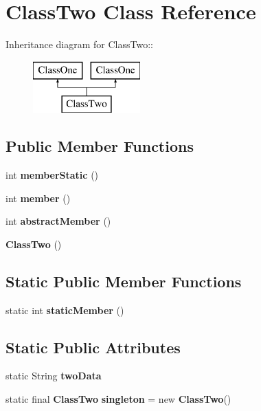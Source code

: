 \section{Class\-Two Class Reference}
\label{classClassTwo}
Inheritance diagram for Class\-Two::\begin{figure}[H]
\begin{center}
\leavevmode
\includegraphics[height=2cm]{classClassTwo}
\end{center}
\end{figure}
\subsection*{Public Member Functions}
\begin{CompactItemize}
\item 
int {\bf member\-Static} ()\label{classClassTwo_7fbc4bae22ce6c2c6348ee93cf6a701d}

\item 
int {\bf member} ()\label{classClassTwo_ba7b803d1e96a6e7d48e2cf0ddd54c57}

\item 
int {\bf abstract\-Member} ()\label{classClassTwo_d553818370e3814ea55209547e87896f}

\item 
{\bf Class\-Two} ()\label{classClassTwo_49ee3fcdec6ea27ef648cba394d297ee}

\end{CompactItemize}
\subsection*{Static Public Member Functions}
\begin{CompactItemize}
\item 
static int {\bf static\-Member} ()\label{classClassTwo_0cee699dd8d3f2aa11d63faef2b3a7e4}

\end{CompactItemize}
\subsection*{Static Public Attributes}
\begin{CompactItemize}
\item 
static String {\bf two\-Data}\label{classClassTwo_8e1d4ca4587b587c5d451f504cfe0b01}

\item 
static final {\bf Class\-Two} {\bf singleton} = new {\bf Class\-Two}()\label{classClassTwo_7120ca61d26d44d72a5acf95828b820e}

\end{CompactItemize}
